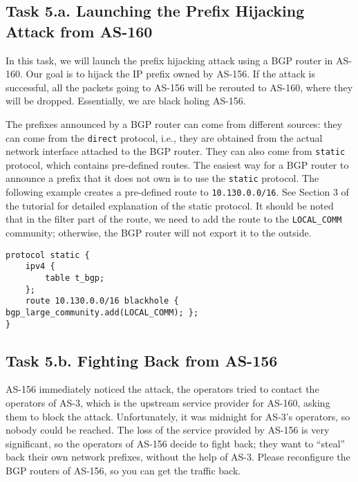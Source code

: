 \subsection{Task 5.a. Launching the Prefix Hijacking Attack from AS-160} 

In this task, we will launch the prefix hijacking attack
using a BGP router in AS-160. Our goal is to hijack
the IP prefix owned by AS-156. If the attack is successful,
all the packets going to AS-156 will be rerouted to AS-160, where
they will be dropped. Essentially, we are black holing AS-156.

The prefixes announced by a BGP router can come from different 
sources: they can come from the \texttt{direct} protocol, 
i.e., they are obtained from the actual network interface attached
to the BGP router. They can also come from \texttt{static} protocol,
which contains pre-defined routes. The easiest way for a BGP router to 
announce a prefix that it does not own is to use 
the \texttt{static} protocol. The following  
example creates a pre-defined route to \texttt{10.130.0.0/16}. 
See Section 3 of the tutorial for detailed explanation of the static protocol.
It should be noted that in the filter part of the route,
we need to add the route to the \texttt{LOCAL\_COMM} community; 
otherwise, the BGP router will not export it to the outside.   

\begin{lstlisting}
protocol static {
    ipv4 {
        table t_bgp;
    };
    route 10.130.0.0/16 blackhole { bgp_large_community.add(LOCAL_COMM); };
}
\end{lstlisting}


\subsection{Task 5.b. Fighting Back from AS-156} 

AS-156 immediately noticed the attack, the operators tried to contact
the operators of AS-3, which is the upstream service provider for AS-160,
asking them to block the attack. Unfortunately, it was midnight for AS-3's
operators, so nobody could be reached. The loss of the service provided 
by AS-156 is very significant, so the operators of AS-156 decide to 
fight back; they want to ``steal'' back their own network prefixes, without the help
of AS-3. Please reconfigure the BGP routers of AS-156, so 
you can get the traffic back. 


